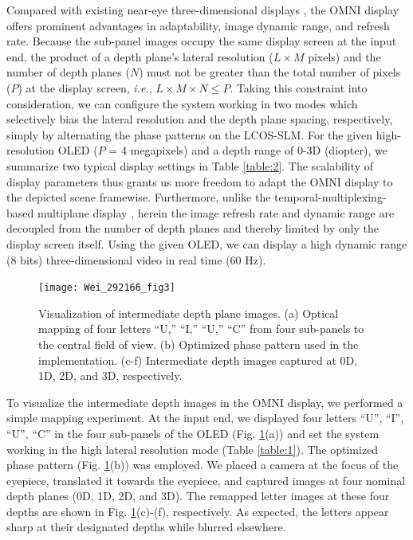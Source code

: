 \documentclass[9pt,twocolumn,twoside]{osajnl}
\begin{document}
Compared with existing near-eye three-dimensional displays \cite{hu2014high,hu2014design,hua20143d,grzegorzek2013time,llull2015design,reichow2014three}, the OMNI display offers prominent advantages in adaptability, image dynamic range, and refresh rate. Because the sub-panel images occupy the same display screen at the input end, the product of a depth plane’s lateral resolution ($L\times M$ pixels) and the number of depth planes ($N$) must not be greater than the total number of pixels ($P$) at the display screen, \emph{i.e.}, $L\times M\times N\leq P$. Taking this constraint into consideration, we can configure the system working in two modes which selectively bias the lateral resolution and the depth plane spacing, respectively, simply by alternating the phase patterns on the LCOS-SLM. For the given high-resolution OLED ($P$ = 4 megapixels) and a depth range of 0-3D (diopter), we summarize two typical display settings in Table \ref{table:2}. The scalability of display parameters thus grants us more freedom to adapt the OMNI display to the depicted scene framewise. Furthermore, unlike the temporal-multiplexing-based multiplane display \cite{hu2014design}, herein the image refresh rate and dynamic range are decoupled from the number of depth planes and thereby limited by only the display screen itself. Using the given OLED, we can display a high dynamic range (8 bits) three-dimensional video in real time (60 Hz).\par
\begin{figure}[htbp]
	\centering
	\texttt{[image: Wei\_292166\_fig3]}
	\caption{Visualization of intermediate depth plane images. (a) Optical mapping of four letters “U,” “I,” “U,” “C” from four sub-panels to the central field of view. (b) Optimized phase pattern used in the implementation. (c-f) Intermediate depth images captured at 0D, 1D, 2D, and 3D, respectively.}
	\label{fig:3}
\end{figure}
To visualize the intermediate depth images in the OMNI display, we performed a simple mapping experiment. At the input end, we displayed four letters “U”, “I”, “U”, “C” in the four sub-panels of the OLED (Fig. \ref{fig:3}(a)) and set the system working in the high lateral resolution mode (Table \ref{table:1}). The optimized phase pattern (Fig. \ref{fig:3}(b)) was employed. We placed a camera at the focus of the eyepiece, translated it towards the eyepiece, and captured images at four nominal depth planes (0D, 1D, 2D, and 3D). The remapped letter images at these four depths are shown in Fig. \ref{fig:3}(c)-(f), respectively. As expected, the letters appear sharp at their designated depths while blurred elsewhere.\par
\end{document}
